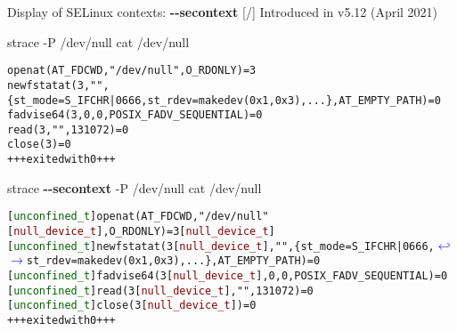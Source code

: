 \documentclass[unicode,aspectratio=169,xcolor={table,dvipsnames,usernames}]{beamer}
\newcommand{\symlinebreak}{\textcolor{blue}{\(\hookleftarrow\)}}
\newcommand{\symlinecont}{\textcolor{blue}{\(\longrightarrow\)}}
\begin{document}
\begin{frame}[fragile]{Display of SELinux contexts: \textbf{-{}-secontext} \hfill [\insertframenumber/\inserttotalframenumber]}
Introduced in v5.12 (April 2021)

\begin{block}{strace -P /dev/null cat /dev/null}
\scriptsize
\begin{alltt}
openat(AT_FDCWD, "/dev/null", O_RDONLY) = 3
newfstatat(3, "", \{st_mode=S_IFCHR|0666, st_rdev=makedev(0x1, 0x3), ...\}, AT_EMPTY_PATH) = 0
fadvise64(3, 0, 0, POSIX_FADV_SEQUENTIAL) = 0
read(3, "", 131072)                     = 0
close(3)                                = 0
+++ exited with 0 +++
\end{alltt}
\end{block}

\begin{block}{strace \textbf{-{}-secontext} -P /dev/null cat /dev/null}
\scriptsize
\begin{alltt}
[\textcolor{darkgreen}{unconfined_t}] openat(AT_FDCWD, "/dev/null" [\textcolor{darkred}{null_device_t}], O_RDONLY) = 3 [\textcolor{darkred}{null_device_t}]
[\textcolor{darkgreen}{unconfined_t}] newfstatat(3 [\textcolor{darkred}{null_device_t}], "", \{st_mode=S_IFCHR|0666, \symlinebreak
\symlinecont st_rdev=makedev(0x1, 0x3), ...\}, AT_EMPTY_PATH) = 0
[\textcolor{darkgreen}{unconfined_t}] fadvise64(3 [\textcolor{darkred}{null_device_t}], 0, 0, POSIX_FADV_SEQUENTIAL) = 0
[\textcolor{darkgreen}{unconfined_t}] read(3 [\textcolor{darkred}{null_device_t}], "", 131072) = 0
[\textcolor{darkgreen}{unconfined_t}] close(3 [\textcolor{darkred}{null_device_t}]) = 0
+++ exited with 0 +++
\end{alltt}
\end{block}
\end{frame}
\end{document}
